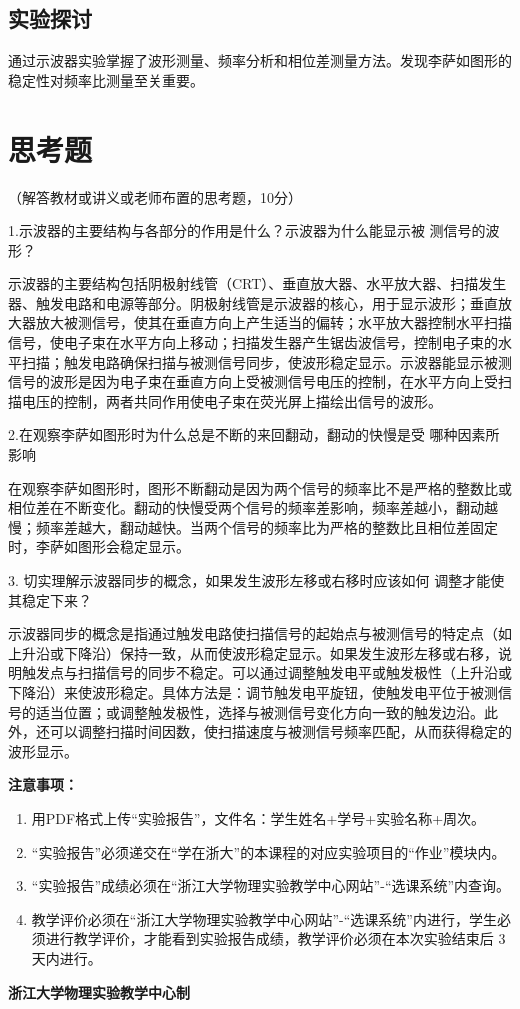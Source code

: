\documentclass[10pt,a4paper]{ctexart}
\newcommand{\sihao}{\fontsize{14pt}{18pt}\selectfont}
\newcommand{\xiaosi}{\fontsize{12pt}{16pt}\selectfont}
\begin{document}
\subsection{实验探讨}
通过示波器实验掌握了波形测量、频率分析和相位差测量方法。发现李萨如图形的稳定性对频率比测量至关重要。
\section{思考题}

    \xiaosi （解答教材或讲义或老师布置的思考题，10分）
    
1.示波器的主要结构与各部分的作用是什么？示波器为什么能显示被
测信号的波形？

示波器的主要结构包括阴极射线管（CRT）、垂直放大器、水平放大器、扫描发生器、触发电路和电源等部分。阴极射线管是示波器的核心，用于显示波形；垂直放大器放大被测信号，使其在垂直方向上产生适当的偏转；水平放大器控制水平扫描信号，使电子束在水平方向上移动；扫描发生器产生锯齿波信号，控制电子束的水平扫描；触发电路确保扫描与被测信号同步，使波形稳定显示。示波器能显示被测信号的波形是因为电子束在垂直方向上受被测信号电压的控制，在水平方向上受扫描电压的控制，两者共同作用使电子束在荧光屏上描绘出信号的波形。

2.在观察李萨如图形时为什么总是不断的来回翻动，翻动的快慢是受
哪种因素所影响

在观察李萨如图形时，图形不断翻动是因为两个信号的频率比不是严格的整数比或相位差在不断变化。翻动的快慢受两个信号的频率差影响，频率差越小，翻动越慢；频率差越大，翻动越快。当两个信号的频率比为严格的整数比且相位差固定时，李萨如图形会稳定显示。

3. 切实理解示波器同步的概念，如果发生波形左移或右移时应该如何
调整才能使其稳定下来？

示波器同步的概念是指通过触发电路使扫描信号的起始点与被测信号的特定点（如上升沿或下降沿）保持一致，从而使波形稳定显示。如果发生波形左移或右移，说明触发点与扫描信号的同步不稳定。可以通过调整触发电平或触发极性（上升沿或下降沿）来使波形稳定。具体方法是：调节触发电平旋钮，使触发电平位于被测信号的适当位置；或调整触发极性，选择与被测信号变化方向一致的触发边沿。此外，还可以调整扫描时间因数，使扫描速度与被测信号频率匹配，从而获得稳定的波形显示。

\sihao\textbf{注意事项：}
\xiaosi
\begin{enumerate}
    \item 用PDF格式上传“实验报告”，文件名：学生姓名+学号+实验名称+周次。
    \item  “实验报告”必须递交在“学在浙大”的本课程的对应实验项目的“作业”模块内。
    \item  “实验报告”成绩必须在“浙江大学物理实验教学中心网站”-“选课系统”内查询。
    \item 教学评价必须在“浙江大学物理实验教学中心网站”-“选课系统”内进行，学生必须进行教学评价，才能看到实验报告成绩，教学评价必须在本次实验结束后 3 天内进行。
\end{enumerate}

\vspace{1cm}
\xiaosi\centering \textbf{浙江大学物理实验教学中心制}
\end{document}
